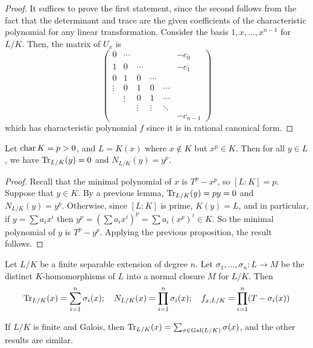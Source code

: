 \begin{proof}
	It suffices to prove the first statement, since the second follows from the fact that the determinant and trace are the given coefficients of the characteristic polynomial for any linear transformation.
	Consider the basis \( 1, x, \dots, x^{n-1} \) for \( L / K \).
	Then, the matrix of \( U_x \) is
	\[ \begin{pmatrix}
		0 & \cdots & & & & -c_0 \\
		1 & 0 & \cdots & & & -c_1 \\
		0 & 1 & 0 & \cdots \\
		\vdots & 0 & 1 & 0 & \cdots \\
		& \vdots & 0 & 1 & \cdots \\
		& & \vdots & \vdots & \ddots \\
		& & & & & -c_{n-1}
	\end{pmatrix} \]
	which has characteristic polynomial \( f \) since it is in rational canonical form.
\end{proof}
\begin{corollary}
	Let \( \operatorname{char} K = p > 0 \), and \( L = K(x) \) where \( x \not\in K \) but \( x^p \in K \).
	Then for all \( y \in L \), we have \( \Tr_{L/K}(y) = 0 \) and \( N_{L/K}(y) = y^p \).
\end{corollary}
\begin{proof}
	Recall that the minimal polynomial of \( x \) is \( T^p - x^p \), so \( [L : K] = p \).
	Suppose that \( y \in K \).
	By a previous lemma, \( \Tr_{L/K}(y) = py = 0 \) and \( N_{L/K}(y) = y^p \).
	Otherwise, since \( [L:K] \) is prime, \( K(y) = L \), and in particular, if \( y = \sum a_i x^i \) then \( y^p = (\sum a_i x^i)^p = \sum a_i (x^p)^i \in K \).
	So the minimal polynomial of \( y \) is \( T^p - y^p \).
	Applying the previous proposition, the result follows.
\end{proof}
\begin{proposition}
	Let \( L / K \) be a finite separable extension of degree \( n \).
	Let \( \sigma_1, \dots, \sigma_n \colon L \to M \) be the distinct \( K \)-homomorphisms of \( L \) into a normal closure \( M \) for \( L / K \).
	Then
	\[ \Tr_{L/K}(x) = \sum_{i=1}^n \sigma_i(x); \quad N_{L/K}(x) = \prod_{i=1}^n \sigma_i(x);\quad f_{x,L/K} = \prod_{i=1}^n (T - \sigma_i(x)) \]
\end{proposition}
\begin{remark}
	If \( L / K \) is finite and Galois, then \( \Tr_{L/K}(x) = \sum_{\sigma \in \operatorname{Gal}(L/K)} \sigma(x) \), and the other results are similar.
\end{remark}
